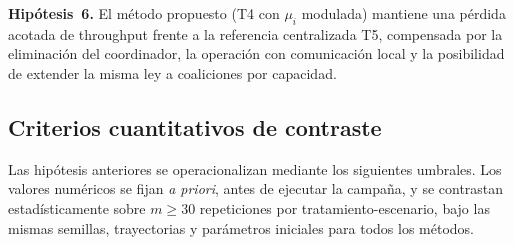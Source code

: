 \textbf{Hipótesis~6.}
El método propuesto (T4 con $\mu_i$ modulada) mantiene una pérdida acotada de
throughput frente a la referencia centralizada T5, compensada por la eliminación
del coordinador, la operación con comunicación local y la posibilidad de extender la
misma ley a coaliciones por capacidad.

\subsection{Criterios cuantitativos de contraste}
\label{subsec:criterios}

Las hipótesis anteriores se operacionalizan mediante los siguientes umbrales. Los
valores numéricos se fijan \emph{a priori}, antes de ejecutar la campaña, y se
contrastan estadísticamente sobre $m \geq 30$ repeticiones por
tratamiento-escenario, bajo las mismas semillas, trayectorias y parámetros
iniciales para todos los métodos.

